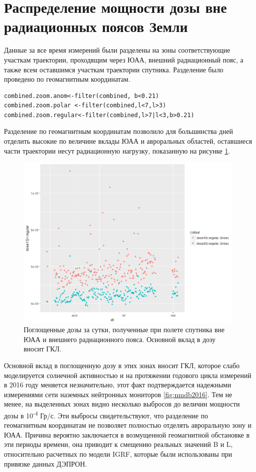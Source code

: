\section{Распределение мощности дозы вне радиационных поясов Земли}
Данные за все время измерений были разделены на зоны соответствующие участкам траектории, проходящим через ЮАА, внешний радиационный пояс, а также всем оставшимся участкам траектории спутника. Разделение было проведено по геомагнитным координатам. 
\begin{verbatim}
combined.zoom.anom<-filter(combined, b<0.21)
combined.zoom.polar <-filter(combined,l<7,l>3)
combined.zoom.regular<-filter(combined,l>7|l<3,b>0.21)
\end{verbatim}
Разделение по геомагнитным координатам позволило для большинства дней отделить высокие по величине вклады ЮАА и авроральных областей, оставшиеся части траектории несут радиационную нагрузку, показанную на рисунке \ref{fig:gcrdose}. 
\begin{figure}
	\centering
	\includegraphics[width=0.5\linewidth]{images/doseanalisys/GCRdose}
	\caption{Поглощенные дозы за сутки, полученные при полете спутника вне ЮАА и внешнего радиационного пояса. Основной вклад в дозу вносит ГКЛ.}
	\label{fig:gcrdose}
\end{figure}
Основной вклад в поглощенную дозу в этих зонах вносит ГКЛ, которое слабо моделируется солнечной активностью и на протяжении годового цикла измерений в 2016 году меняется незначительно, этот факт подтверждается надежными измерениями сети наземных нейтронных мониторов \ref{fig:nmdb2016}. Тем не менее, на выделенных зонах видно несколько выбросов до величин мощности дозы в 10\textsuperscript{-4} Гр/с. Эти выбросы свидетельствуют, что разделение по геомагнитным координатам не позволяет полностью отделять авроральную зону и ЮАА. Причина вероятно заключается в возмущенной геомагнитной обстановке в эти периоды времени, она приводит к смещению реальных значений B и L, относительно расчетных по модели IGRF, которые были использованы при привязке данных ДЭПРОН.

